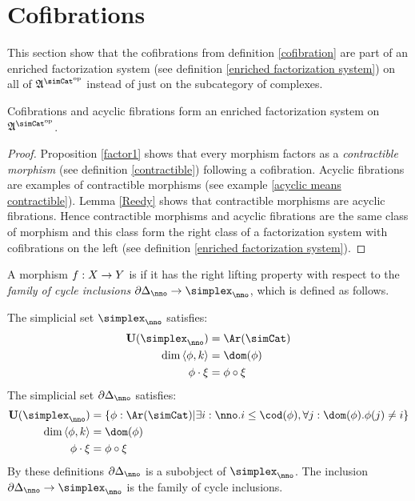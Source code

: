 \documentclass[csh.tex]{subfiles}
\begin{document}
\section{Cofibrations}
This section show that the cofibrations from definition \ref{cofibration} are part of an enriched factorization system (see definition \ref{enriched factorization system}) on all of $\ambient\s$ instead of just on the subcategory of complexes.

\begin{lemma} Cofibrations and acyclic fibrations form an enriched factorization system on $\ambient\s$. \label{factorization system 1} \end{lemma}

\begin{proof} Proposition \ref{factor1} shows that every morphism factors as a \emph{contractible morphism} (see definition \ref{contractible}) following a cofibration. Acyclic fibrations are examples of contractible morphisms (see example \ref{acyclic means contractible}). Lemma \ref{Reedy} shows that contractible morphisms are acyclic fibrations. Hence contractible morphisms and acyclic fibrations are the same class of morphism and this class form the right class of a factorization system with cofibrations on the left (see definition \ref{enriched factorization system}).
\end{proof}

\begin{definition} A morphism $f: X\to Y$ is  if it has the right lifting property with respect to the \emph{family of cycle inclusions} $\cycle_\nno \to \simplex_\nno$, which is defined as follows.

The simplicial set $\simplex_\nno$ satisfies:
\begin{align*}
\base(\simplex_\nno) &= \Ar(\simCat) \\
\dim\tuplet{\phi,k} &= \dom(\phi) \\
\phi\cdot \xi &=\phi\circ\xi
\end{align*}
The simplicial set $\cycle_\nno$ satisfies:
\begin{align*}
\base(\simplex_\nno) &= \set{\phi\of\Ar(\simCat)\middle|\exists i\of\nno.i\leq \cod(\phi),\forall j\of \dom(\phi).\phi(j)\neq i} \\
\dim\tuplet{\phi,k} &= \dom(\phi) \\
\phi\cdot \xi &=\phi\circ\xi
\end{align*}
By these definitions $\cycle_\nno$ is a subobject of $\simplex_\nno$. The inclusion $\cycle_\nno \to \simplex_\nno$ is the family of cycle inclusions.
\end{definition}
\end{document}
